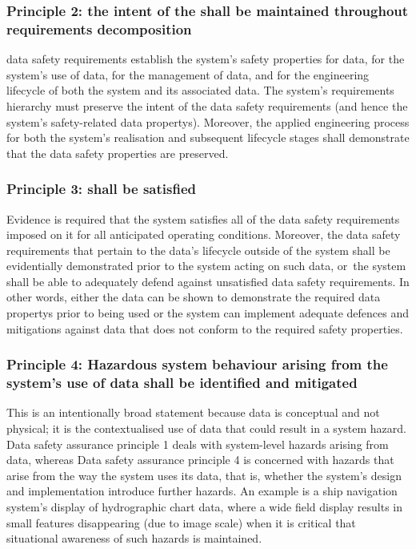 \subsubsection{Principle 2: the intent of the  shall be maintained throughout requirements decomposition}
\Glspl{data safety requirement} establish the system's safety properties for data, for the system's use of data, for the management of data, and for the engineering lifecycle of both the system and its associated data. The system's requirements hierarchy must preserve the intent of the \glspl{data safety requirement} (and hence the system's safety-related \glspl{data property}). Moreover, the applied engineering process for both the system's realisation and subsequent lifecycle stages shall demonstrate that the data safety properties are preserved.

\subsubsection{Principle 3:  shall be satisfied}
Evidence is required that the system satisfies all of the \glspl{data safety requirement} imposed on it for all anticipated operating conditions. Moreover, the \glspl{data safety requirement} that pertain to the data's lifecycle outside of the system shall be evidentially demonstrated prior to the system acting on such data, \cbstart or\cbend\ the system shall be able to adequately defend against unsatisfied \glspl{data safety requirement}. In other words, either the data can be shown to demonstrate the required \glspl{data property} prior to being used or the system can implement adequate defences and \glspl{mitigation} against data that does not conform to the required safety properties.

\subsubsection{Principle 4: Hazardous system behaviour arising from the system's use of data shall be identified and mitigated}
This is an intentionally broad statement because data is conceptual and not physical; it is the contextualised use of data that could result in a system hazard. Data safety assurance principle 1 deals with system-level hazards arising from data, whereas Data safety assurance principle 4 is concerned with hazards that arise from the way the system uses its data, that is, whether the system's design and implementation introduce further hazards. An example is a ship navigation system's display of hydrographic chart data, where a wide field display results in small features disappearing (due to image scale) when it is critical that situational awareness of such hazards is maintained.

